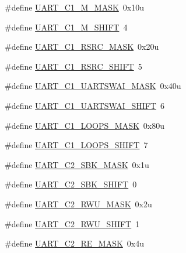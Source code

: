 \begin{DoxyCompactItemize}
\item 
\#define \hyperlink{group___u_a_r_t___register___masks_gabbe5c7cb60072d535d068446606414c5}{U\+A\+R\+T\+\_\+\+C1\+\_\+\+M\+\_\+\+M\+A\+SK}~0x10u
\item 
\#define \hyperlink{group___u_a_r_t___register___masks_ga591070f161ecf5cf35b0e6927b5e4c77}{U\+A\+R\+T\+\_\+\+C1\+\_\+\+M\+\_\+\+S\+H\+I\+FT}~4
\item 
\#define \hyperlink{group___u_a_r_t___register___masks_gaaeb3cc3491cd77f71150bfa9cce03518}{U\+A\+R\+T\+\_\+\+C1\+\_\+\+R\+S\+R\+C\+\_\+\+M\+A\+SK}~0x20u
\item 
\#define \hyperlink{group___u_a_r_t___register___masks_gac773b486d570b26d17a7d522016f683a}{U\+A\+R\+T\+\_\+\+C1\+\_\+\+R\+S\+R\+C\+\_\+\+S\+H\+I\+FT}~5
\item 
\#define \hyperlink{group___u_a_r_t___register___masks_ga466f5bf7b0cd3c3517da3a6c6a9baaac}{U\+A\+R\+T\+\_\+\+C1\+\_\+\+U\+A\+R\+T\+S\+W\+A\+I\+\_\+\+M\+A\+SK}~0x40u
\item 
\#define \hyperlink{group___u_a_r_t___register___masks_gac7888d995fd947613eea08bdee534ffc}{U\+A\+R\+T\+\_\+\+C1\+\_\+\+U\+A\+R\+T\+S\+W\+A\+I\+\_\+\+S\+H\+I\+FT}~6
\item 
\#define \hyperlink{group___u_a_r_t___register___masks_ga08f1bbd905640d81967f9fb6d4ed8ec8}{U\+A\+R\+T\+\_\+\+C1\+\_\+\+L\+O\+O\+P\+S\+\_\+\+M\+A\+SK}~0x80u
\item 
\#define \hyperlink{group___u_a_r_t___register___masks_gac6beea8a7bad0b0fc3c3535f629fcf3a}{U\+A\+R\+T\+\_\+\+C1\+\_\+\+L\+O\+O\+P\+S\+\_\+\+S\+H\+I\+FT}~7
\item 
\#define \hyperlink{group___u_a_r_t___register___masks_ga8d243e5b3a3ece12bdeca818bacb15ee}{U\+A\+R\+T\+\_\+\+C2\+\_\+\+S\+B\+K\+\_\+\+M\+A\+SK}~0x1u
\item 
\#define \hyperlink{group___u_a_r_t___register___masks_ga94f62ff8a45a08ae54b40da725fb245b}{U\+A\+R\+T\+\_\+\+C2\+\_\+\+S\+B\+K\+\_\+\+S\+H\+I\+FT}~0
\item 
\#define \hyperlink{group___u_a_r_t___register___masks_ga279868a42acca3c1eeba8c53bb94b208}{U\+A\+R\+T\+\_\+\+C2\+\_\+\+R\+W\+U\+\_\+\+M\+A\+SK}~0x2u
\item 
\#define \hyperlink{group___u_a_r_t___register___masks_gaa163993d547a96c2ea002ff52e6b0971}{U\+A\+R\+T\+\_\+\+C2\+\_\+\+R\+W\+U\+\_\+\+S\+H\+I\+FT}~1
\item 
\#define \hyperlink{group___u_a_r_t___register___masks_ga181a8e8fd0f780d45f1bff7c76836fe5}{U\+A\+R\+T\+\_\+\+C2\+\_\+\+R\+E\+\_\+\+M\+A\+SK}~0x4u
\item 

\end{DoxyCompactItemize}
